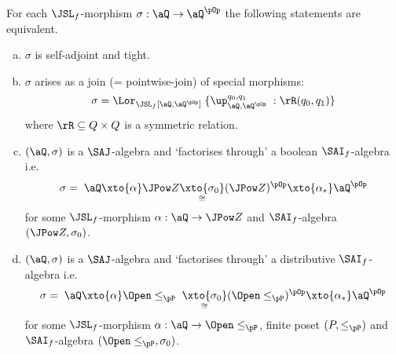 \documentclass{article}
\begin{document}
\begin{theorem}
  \item
  For each $\JSL_f$-morphism $\sigma : \aQ \to \aQ^{\pOp}$ the following statements are equivalent.
  \begin{enumerate}[a.]
  \item
  $\sigma$ is self-adjoint and tight.
  
  \item
  $\sigma$ arises as a join (= pointwise-join) of special morphisms:
  \[
  \sigma
  = \Lor_{\JSL_f[\aQ,\aQ^{\pOp}]} \; \{ \up_{\aQ,\aQ^{\pOp}}^{q_0,q_1} \; : \rR(q_0,q_1) \}
  \]
  where $\rR \subseteq Q \times Q$ is a symmetric relation.
  
  \item
  $(\aQ,\sigma)$ is a $\SAJ$-algebra and `factorises through' a boolean $\SAI_f$-algebra i.e.\
  \[
  \sigma = \;
  \aQ \xto{\alpha} \JPow Z \underset{\cong}{\xto{\sigma_0}} (\JPow Z)^{\pOp} \xto{\alpha_*} \aQ^{\pOp}
  \]
  for some $\JSL_f$-morphism $\alpha : \aQ \to \JPow Z$ and $\SAI_f$-algebra $(\JPow Z, \sigma_0)$.
  
  \item
  $(\aQ,\sigma)$ is a $\SAJ$-algebra and `factorises through' a distributive $\SAI_f$-algebra i.e.\
  \[
  \sigma
  = \;
  \aQ \xto{\alpha} \Open \leq_\pP \; \underset{\cong}{\xto{\sigma_0}} (\Open \leq_\pP)^{\pOp} \xto{\alpha_*} \aQ^{\pOp}
  \]
  for some $\JSL_f$-morphism $\alpha : \aQ \to \Open \leq_\pP$, finite poset $(P,\leq_\pP)$ and $\SAI_f$-algebra $(\Open \leq_\pP, \sigma_0)$.
  
  
  \end{enumerate}
  
  \end{theorem}
  
\end{document}

